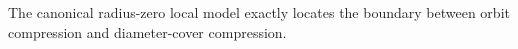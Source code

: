 The canonical radius-zero local model exactly locates the boundary between orbit compression and diameter-cover compression.